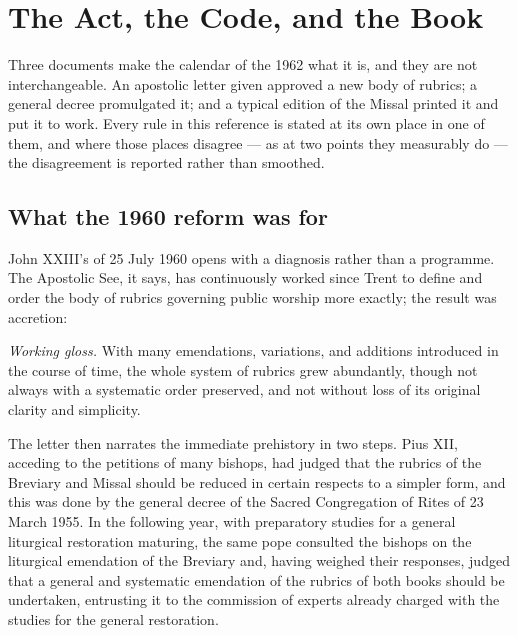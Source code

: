 \section{The Act, the Code, and the Book}

Three documents make the calendar of the 1962  what it is, and they
are not interchangeable. An apostolic letter given  approved a new body of
rubrics; a general decree promulgated it; and a typical edition of the Missal printed it and
put it to work. Every rule in this reference is stated at its own place in one of them, and
where those places disagree — as at two points they measurably do — the disagreement is
reported rather than smoothed.

\subsection{What the 1960 reform was for}

John XXIII's  of 25 July 1960 opens with a diagnosis rather than
a programme. The Apostolic See, it says, has continuously worked since Trent to define and
order the body of rubrics governing public worship more exactly; the result was accretion:

\begin{studyframe}
\medskip

\textit{Working gloss.} With many emendations, variations, and additions introduced in the
course of time, the whole system of rubrics grew abundantly, though not always with a
systematic order preserved, and not without loss of its original clarity and simplicity.
\end{studyframe}

The letter then narrates the immediate prehistory in two steps. Pius XII, acceding to the
petitions of many bishops, had judged that the rubrics of the Breviary and Missal should be
reduced in certain respects to a simpler form, and this was done by the general decree of the
Sacred Congregation of Rites of 23 March 1955. In the following year, with preparatory studies
for a general liturgical restoration maturing, the same pope consulted the bishops on the
liturgical emendation of the Breviary and, having weighed their responses, judged that a
general and systematic emendation of the rubrics of both books should be undertaken, entrusting
it to the commission of experts already charged with the studies for the general restoration.


